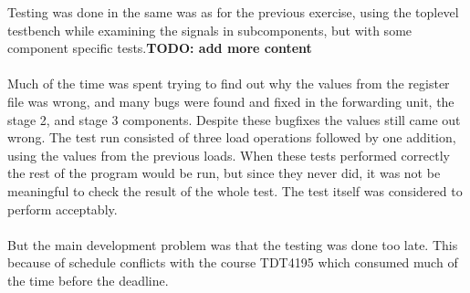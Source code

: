 Testing was done in the same was as for the previous exercise, using the
toplevel testbench while examining the signals in subcomponents, but with some
component specific tests.\textbf{TODO: add more content}
\paragraph*{}
Much of the time was spent trying to find out why the values from the register
file was wrong, and many bugs were found and fixed in the forwarding unit, the
stage 2, and stage 3 components. Despite these bugfixes the values still came
out wrong. The test run consisted of three load operations followed by one
addition, using the values from the previous loads. When these tests performed
correctly the rest of the program would be run, but since they never did, it
was not be meaningful to check the result of the whole test. The test itself was
considered to perform acceptably.
\paragraph*{}
But the main development problem was that the testing was done too late. This
because of schedule conflicts with the course TDT4195 which consumed much of the
time before the deadline.
